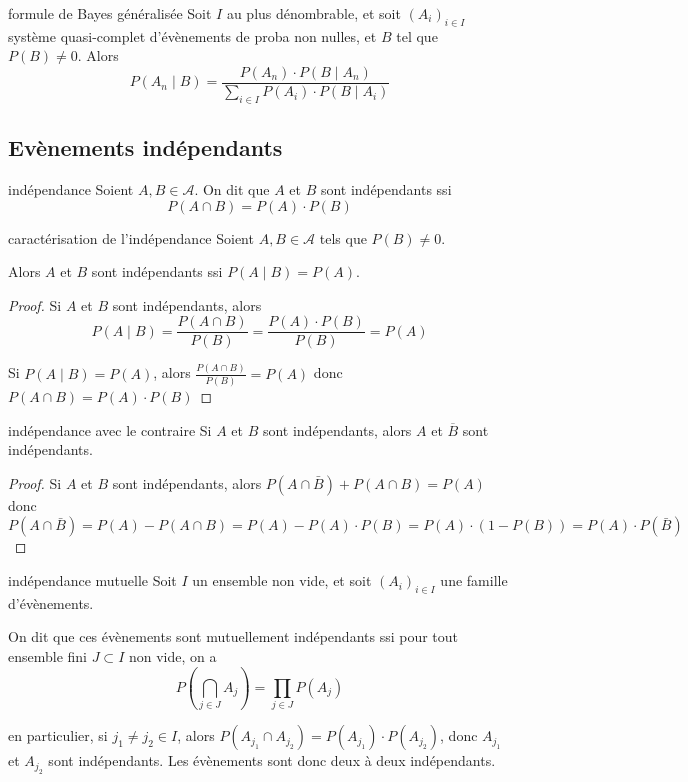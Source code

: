 \begin{corollaire}{formule de Bayes généralisée}{}
    Soit $I$ au plus dénombrable, et soit $(A_i)_{i \in I}$ système quasi-complet d'évènements 
    de proba non nulles, et $B$ tel que $P(B) \neq 0$. Alors 
    $$ P(A_n \mid B) = \frac{P(A_n) \cdot P(B \mid A_n)}{\sum_{i \in I} P(A_i) \cdot P(B \mid A_i)} $$
\end{corollaire}

\subsection{Evènements indépendants}
\begin{definition}{indépendance}{}
    Soient $A, B \in \mathcal A$. On dit que $A$ et $B$ sont indépendants ssi 
    $$ P(A \cap B) = P(A) \cdot P(B) $$
\end{definition}

\begin{proposition}{caractérisation de l'indépendance}{}
    Soient $A, B \in \mathcal A$ tels que $P(B) \neq 0$. 

    Alors $A$ et $B$ sont indépendants ssi $P(A \mid B) = P(A)$.
\end{proposition}

\begin{proof}
    Si $A$ et $B$ sont indépendants, alors 
    $$ P(A \mid B) = \frac{P(A \cap B)}{P(B)} = \frac{P(A) \cdot P(B)}{P(B)} = P(A) $$

    Si $P(A \mid B) = P(A)$, alors
    $ \frac{P(A \cap B)  }{P(B) } = P(A) $ donc $P(A \cap B) = P(A) \cdot P(B)$
\end{proof}

\begin{proposition}{indépendance avec le contraire}{}
    Si $A$ et $B$ sont indépendants, alors $A$ et $\overline B$ sont indépendants. 
\end{proposition}


\begin{proof}
    Si $A$ et $B$ sont indépendants, alors 
    $P(A \cap \bar B) + P(A \cap B) = P(A)$
    donc $P(A \cap \bar B) = P(A) - P(A \cap B) = P(A) - P(A) \cdot P(B) = P(A) \cdot (1 - P(B)) = P(A) \cdot P(\bar B)$
\end{proof}

\begin{definition}{indépendance mutuelle}{}
    Soit $I$ un ensemble non vide, et soit $(A_i)_{i \in I}$ une famille d'évènements.

    On dit que ces évènements sont mutuellement indépendants ssi pour tout
    ensemble fini $J \subset I$ non vide, on a 
    $$ P\left( \bigcap_{j \in J} A_j \right) = \prod_{j \in J} P(A_j) $$

    en particulier, si $j_1 \neq j_2 \in I$, alors 
    $P(A_{j_1} \cap A_{j_2}) = P(A_{j_1}) \cdot P(A_{j_2})$, donc 
    $A_{j_1}$ et $A_{j_2}$ sont indépendants. Les évènements sont donc deux à deux indépendants.
\end{definition}

